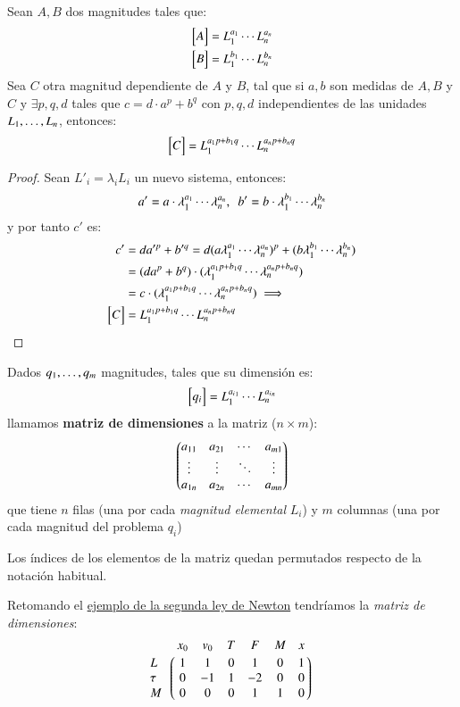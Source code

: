 \begin{pro}
    Sean $A, B$ dos magnitudes tales que:
    \begin{align*}
        \mx{A} &= \Multn{L}{a}\\
        \mx{B} &= \Multn{L}{b}
    \end{align*}
    Sea $C$ otra magnitud dependiente de $A$ y $B$, tal que si $a, b$ son medidas de $A, B$ y $C$ y $\exists p, q, d$ tales que $c = d\cdot a^p + b^q$ con $p, q, d$ independientes de las unidades ${L}_{1}, \ldots, {L}_{n}$, entonces:
    $$
        \mx{C} = L_1^{a_1p + b_1q} \cdots L_n^{a_n p + b_n q}
    $$
\end{pro}

\begin{proof}
    Sean $L'_i = \lambda_i L_i$ un nuevo sistema, entonces:
    $$
        a' = a \cdot {\lambda}_{1}^{a_{1}} \cdots {\lambda}_{n}^{a_{n}},\ \ b' = b \cdot {\lambda}_{1}^{b_{1}} \cdots {\lambda}_{n}^{b_{n}}
    $$
    y por tanto $c'$ es:
    \begin{align*}
        c' &= da'^p + b'^q = d(a\Multn{\lambda}{a})^p + (b\Multn{\lambda}{b})\\
          &= (da^p + b^q) \cdot (\lambda_1^{a_1p+b_1q} \cdots \lambda_n^{a_np+b_nq})\\
          &=  c \cdot (\lambda_1^{a_1p+b_1q} \cdots \lambda_n^{a_np+b_nq}) \implies\\
          \mx{C} &= L_1^{a_1p + b_1q} \cdots L_n^{a_n p + b_n q}
    \end{align*}
\end{proof}

\begin{dfn}
    Dados ${q}_{1}, \ldots, {q}_{m}$ magnitudes, tales que su dimensión es:
    $$
        \mx{q_i} = \Multn{L}{{a_i}}
    $$
    llamamos \textbf{matriz de dimensiones} a la matriz ($n \times m$):
    $$
        \dmx{
            a_{11} & a_{21} & \cdots & a_{m1}\\
            \vdots & \vdots & \ddots & \vdots\\
            a_{1n} & a_{2n} & \cdots & a_{mn}
            }
    $$
    que tiene $n$ filas (una por cada \textit{magnitud elemental} $L_i$) y $m$ columnas (una por cada magnitud del problema $q_i$)
\end{dfn}

\begin{obs}
    Los índices de los elementos de la matriz quedan permutados respecto de la notación habitual.
\end{obs}

Retomando el \hyperref[eg:1]{ejemplo de la segunda ley de Newton} tendríamos la \textit{matriz de dimensiones}:
$$
    \Dmx{~ & x_0 & v_0 & T & F & M & x \cr
        L & 1 & 1 & 0 & 1 & 0 & 1\cr
        \tau & 0 & -1 & 1 & -2 & 0 & 0\cr
        M & 0 & 0 & 0 & 1 & 1 & 0
    }
$$

